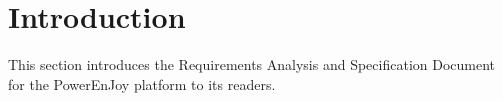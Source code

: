\chapter{Introduction}
This section introduces the Requirements Analysis and Specification Document for the PowerEnJoy platform to its readers.






